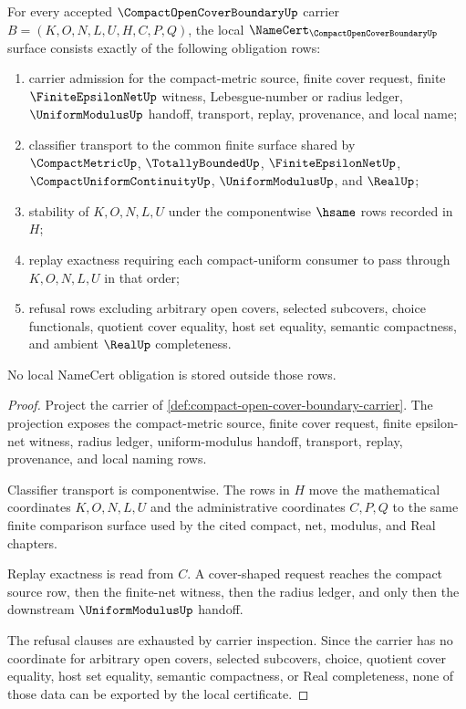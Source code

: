 \begin{theorem}
\label{thm:compact-open-cover-boundary-namecert-obligations}
For every accepted $\CompactOpenCoverBoundaryUp$ carrier
$B=(K,O,N,L,U,H,C,P,Q)$, the local
$\NameCert_{\CompactOpenCoverBoundaryUp}$ surface consists exactly of the
following obligation rows:
\begin{enumerate}
\item carrier admission for the compact-metric source, finite cover request,
finite $\FiniteEpsilonNetUp$ witness, Lebesgue-number or radius ledger,
$\UniformModulusUp$ handoff, transport, replay, provenance, and local name;
\item classifier transport to the common finite surface shared by
$\CompactMetricUp$, $\TotallyBoundedUp$, $\FiniteEpsilonNetUp$,
$\CompactUniformContinuityUp$, $\UniformModulusUp$, and $\RealUp$;
\item stability of $K,O,N,L,U$ under the componentwise $\hsame$ rows recorded
in $H$;
\item replay exactness requiring each compact-uniform consumer to pass through
$K,O,N,L,U$ in that order;
\item refusal rows excluding arbitrary open covers, selected subcovers, choice
functionals, quotient cover equality, host set equality, semantic compactness,
and ambient $\RealUp$ completeness.
\end{enumerate}
No local NameCert obligation is stored outside those rows.
\end{theorem}
\begin{proof}
Project the carrier of
\autoref{def:compact-open-cover-boundary-carrier}. The projection exposes the
compact-metric source, finite cover request, finite epsilon-net witness,
radius ledger, uniform-modulus handoff, transport, replay, provenance, and
local naming rows.

Classifier transport is componentwise. The rows in $H$ move the mathematical
coordinates $K,O,N,L,U$ and the administrative coordinates $C,P,Q$ to the same
finite comparison surface used by the cited compact, net, modulus, and Real
chapters.

Replay exactness is read from $C$. A cover-shaped request reaches the compact
source row, then the finite-net witness, then the radius ledger, and only then
the downstream $\UniformModulusUp$ handoff.

The refusal clauses are exhausted by carrier inspection. Since the carrier has
no coordinate for arbitrary open covers, selected subcovers, choice, quotient
cover equality, host set equality, semantic compactness, or Real completeness,
none of those data can be exported by the local certificate.
\end{proof}

